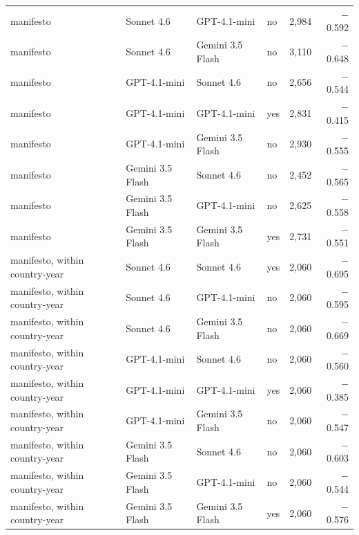 \begin{table}[ht]
{\begin{tabular}{llllrr}
manifesto & Sonnet 4.6 & GPT-4.1-mini & no & 2,984 & $-$0.592 \\
manifesto & Sonnet 4.6 & Gemini 3.5 Flash & no & 3,110 & $-$0.648 \\
manifesto & GPT-4.1-mini & Sonnet 4.6 & no & 2,656 & $-$0.544 \\
manifesto & GPT-4.1-mini & GPT-4.1-mini & yes & 2,831 & $-$0.415 \\
manifesto & GPT-4.1-mini & Gemini 3.5 Flash & no & 2,930 & $-$0.555 \\
manifesto & Gemini 3.5 Flash & Sonnet 4.6 & no & 2,452 & $-$0.565 \\
manifesto & Gemini 3.5 Flash & GPT-4.1-mini & no & 2,625 & $-$0.558 \\
manifesto & Gemini 3.5 Flash & Gemini 3.5 Flash & yes & 2,731 & $-$0.551 \\
manifesto, within country-year & Sonnet 4.6 & Sonnet 4.6 & yes & 2,060 & $-$0.695 \\
manifesto, within country-year & Sonnet 4.6 & GPT-4.1-mini & no & 2,060 & $-$0.595 \\
manifesto, within country-year & Sonnet 4.6 & Gemini 3.5 Flash & no & 2,060 & $-$0.669 \\
manifesto, within country-year & GPT-4.1-mini & Sonnet 4.6 & no & 2,060 & $-$0.560 \\
manifesto, within country-year & GPT-4.1-mini & GPT-4.1-mini & yes & 2,060 & $-$0.385 \\
manifesto, within country-year & GPT-4.1-mini & Gemini 3.5 Flash & no & 2,060 & $-$0.547 \\
manifesto, within country-year & Gemini 3.5 Flash & Sonnet 4.6 & no & 2,060 & $-$0.603 \\
manifesto, within country-year & Gemini 3.5 Flash & GPT-4.1-mini & no & 2,060 & $-$0.544 \\
manifesto, within country-year & Gemini 3.5 Flash & Gemini 3.5 Flash & yes & 2,060 & $-$0.576 \\
\bottomrule
\end{tabular}}
\end{table}
